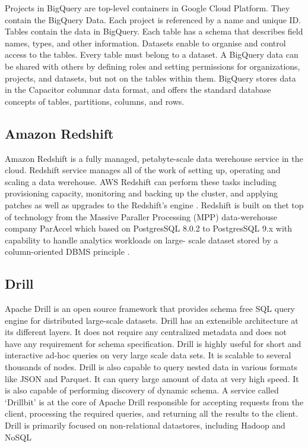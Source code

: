      Projects in BigQuery \cite{www-bigquery-documentation} are
     top-level containers in Google Cloud Platform. They contain the
     BigQuery Data. Each project is referenced by a name and
     unique ID. Tables contain the data in BigQuery. Each table has a
     schema that describes field names, types, and other
     information. Datasets enable to organise and control access to
     the tables. Every table must belong to a dataset. A BigQuery data
     can be shared with others by defining roles and setting
     permissions for organizations, projects, and datasets, but not on
     the tables within them. BigQuery stores data in the
     \cite{www-bigquery-columnar-storage} Capacitor columnar data
     format, and offers the standard database concepts of tables,
     partitions, columns, and rows.

     
\subsection{ Amazon Redshift}
     
     Amazon Redshift is a fully managed, petabyte-scale data werehouse
     service in the cloud. Redshift service manages all of the work of
     setting up, operating and scaling a data werehouse. AWS Redshift
     can perform these tasks including provisioning capacity,
     monitoring and backing up the cluster, and applying patches as
     well as upgrades to the Redshift's engine \cite{www-redshift}.
     Redshift is built on thet top of technology from the Massive
     Paraller Processing (MPP) data-werehouse company ParAccel which
     based on PostgresSQL 8.0.2 to PostgresSQL 9.x with capability to
     handle analytics workloads on large- scale dataset stored by a
     column-oriented DBMS principle \cite{www-wiki-red}.

\subsection{ Drill}

     Apache Drill \cite{www-ApacheDrill} is an open source framework
     that provides schema free SQL query engine for distributed 
     large-scale datasets. Drill has an extensible architecture at 
     its different layers. It does not require any centralized 
     metadata and does not have any requirement for schema 
     specification. Drill is highly useful for short and interactive
     ad-hoc queries on very large scale data sets. It is scalable to
     several thousands of nodes. Drill is also capable to query 
     nested data in various formats like JSON and Parquet. It can 
     query large amount of data at very high speed. It is also  
     capable of performing discovery of dynamic schema. 
     A service called ‘Drillbit’  is at the core of Apache Drill 
     responsible for accepting requests from the client, processing
     the required queries, and returning all the results to the client.
     Drill is primarily focused on non-relational datastores, 
     including Hadoop and NoSQL

